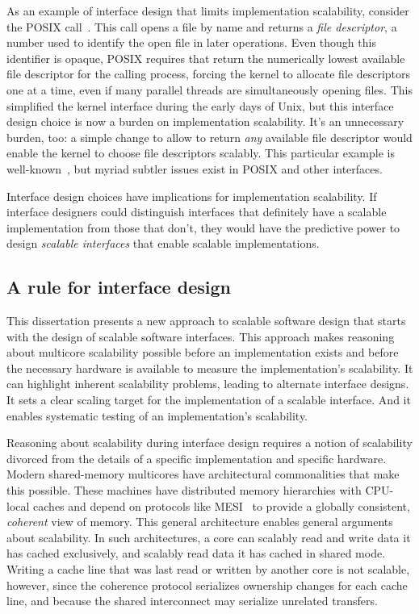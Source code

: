 As an example of interface design that limits implementation
scalability, consider the POSIX  call~\cite{posix2013}.
%
This call opens a
file by name and returns a \emph{file descriptor}, a number used to
identify the open file in later operations.
%
Even though this identifier is opaque, POSIX requires that 
return the numerically lowest available file descriptor for the
calling process, forcing the kernel to allocate file descriptors one
at a time, even if many parallel threads are simultaneously opening
files.
%
This simplified the kernel interface during the early days of Unix,
but this interface design choice is now a burden on implementation
scalability.
%
It's an unnecessary burden, too: a simple change to allow 
to return \emph{any} available file descriptor would enable the kernel
to choose file descriptors scalably.
%
This particular example is well-known~\cite{boyd-wickizer:corey}, but
myriad subtler issues exist in POSIX and other interfaces.

Interface design choices have implications for implementation
scalability.
%
If interface designers could distinguish interfaces that definitely
have a scalable implementation from those that don't, they would have
the predictive power to design \emph{scalable interfaces} that enable
scalable implementations.


\subsection{A rule for interface design}

This dissertation presents a new approach to scalable software design
that starts with the design of scalable software interfaces.
%
This approach makes reasoning about multicore scalability possible
before an implementation exists and before the necessary hardware is
available to measure the implementation's scalability.
%
It can highlight inherent scalability problems, leading to alternate
interface designs.
%
It sets a clear scaling target for the implementation of a
scalable interface.  And it enables systematic testing of an
implementation's scalability.

Reasoning about scalability during interface design requires a notion
of scalability divorced from the details of a specific
implementation and specific hardware.
%
Modern shared-memory multicores have architectural commonalities that
make this possible.  These machines have distributed memory
hierarchies with CPU-local caches and depend on protocols like
MESI~\cite{papamarcos:mesi} to provide a globally consistent,
\emph{coherent} view of memory.  This general architecture enables
general arguments about scalability.
%
In such architectures, a core can scalably read and write data it has
cached exclusively, and scalably read data it has cached in shared
mode. Writing a cache line that was last read or written by another
core is not scalable, however, since the coherence protocol serializes
ownership changes for each cache line, and because the shared
interconnect may serialize unrelated transfers.

